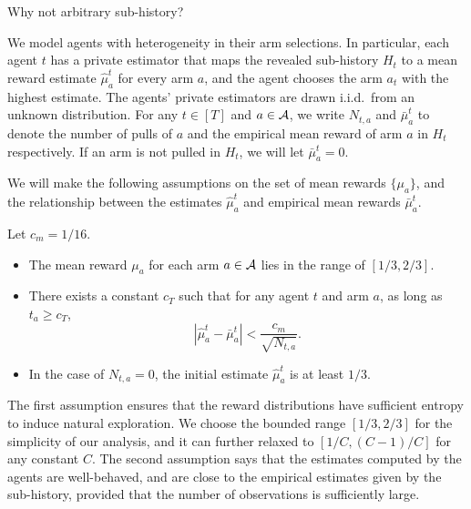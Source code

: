 \begin{remark}
  Why not arbitrary sub-history? 
\end{remark}

 We model agents with heterogeneity in their
arm selections. In particular, each agent $t$ has a private estimator
that maps the revealed sub-history $H_t$ to a mean reward estimate
$\hat{\mu}_a^t$ for every arm $a$, and the agent chooses the arm $a_t$
with the highest estimate. The agents' private estimators are drawn
i.i.d.~from an unknown distribution. For any $t\in[T]$ and $a\in \mathcal{A}$,
we write $N_{t, a}$ and $\bar{\mu}_a^t$ to denote the number of pulls
of $a$ and the empirical mean reward of arm $a$ in $H_t$
respectively. If an arm is not pulled in $H_t$, we will let
$\bar{\mu}_a^t = 0$.


We will make the following assumptions on the set of mean rewards
$\{\mu_a\}$, and the relationship between the estimates $\hat \mu_a^t$
and empirical mean rewards $\bar\mu_a^t$.



\begin{assumption}
\label{ass:embehave}
Let $c_m = 1/16$. 
\begin{itemize}
\item The mean reward $\mu_a$ for each arm $a\in \mathcal{A}$ lies in the range
  of $[1/3, 2/3]$.


\item There exists a constant $c_T$ such that for any agent $t$ and
  arm $a$, as long as $t_a \geq c_T$,
\[
  \left|\hat{\mu}^t_a - \bar{\mu}^t_a \right| <
  \frac{c_m}{\sqrt{N_{t,a}}}.
\]
\item In the case of $N_{t,a} = 0$, the initial estimate
  $\hat{\mu}^t_a$ is at least $1/3$.
\end{itemize}
\end{assumption}


The first assumption ensures that the reward distributions have
sufficient entropy to induce natural exploration. We choose the
bounded range $[1/3, 2/3]$ for the simplicity of our analysis, and it
can further relaxed to $[1/C, (C-1)/C]$ for any constant $C$. The
second assumption says that the estimates computed by the agents are
well-behaved, and are close to the empirical estimates given by the
sub-history, provided that the number of observations is sufficiently
large.


